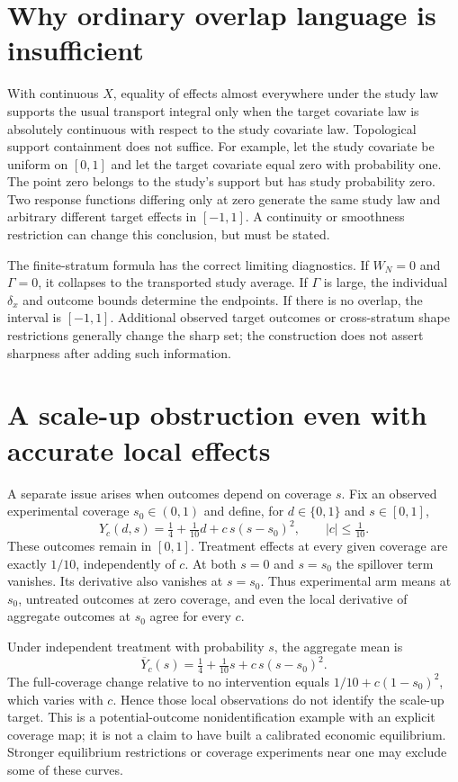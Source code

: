 \documentclass[11pt]{article}
\begin{document}
\section*{Why ordinary overlap language is insufficient}
With continuous $X$, equality of effects almost everywhere under the study law supports the usual transport integral only when the target covariate law is absolutely continuous with respect to the study covariate law. Topological support containment does not suffice. For example, let the study covariate be uniform on $[0,1]$ and let the target covariate equal zero with probability one. The point zero belongs to the study's support but has study probability zero. Two response functions differing only at zero generate the same study law and arbitrary different target effects in $[-1,1]$. A continuity or smoothness restriction can change this conclusion, but must be stated.

The finite-stratum formula has the correct limiting diagnostics. If $W_N=0$ and $\Gamma=0$, it collapses to the transported study average. If $\Gamma$ is large, the individual $\delta_x$ and outcome bounds determine the endpoints. If there is no overlap, the interval is $[-1,1]$. Additional observed target outcomes or cross-stratum shape restrictions generally change the sharp set; the construction does not assert sharpness after adding such information.

\section*{A scale-up obstruction even with accurate local effects}
A separate issue arises when outcomes depend on coverage $s$. Fix an observed experimental coverage $s_0\in(0,1)$ and define, for $d\in\{0,1\}$ and $s\in[0,1]$,
\[
 Y_c(d,s)=\tfrac14+\tfrac1{10}d+c\,s(s-s_0)^2,
 \qquad |c|\leq\tfrac1{10}.
\]
These outcomes remain in $[0,1]$. Treatment effects at every given coverage are exactly $1/10$, independently of $c$. At both $s=0$ and $s=s_0$ the spillover term vanishes. Its derivative also vanishes at $s=s_0$. Thus experimental arm means at $s_0$, untreated outcomes at zero coverage, and even the local derivative of aggregate outcomes at $s_0$ agree for every $c$.

Under independent treatment with probability $s$, the aggregate mean is
\[
 \overline Y_c(s)=\tfrac14+\tfrac1{10}s+c\,s(s-s_0)^2.
\]
The full-coverage change relative to no intervention equals
$1/10+c(1-s_0)^2$, which varies with $c$. Hence those local observations do not identify the scale-up target. This is a potential-outcome nonidentification example with an explicit coverage map; it is not a claim to have built a calibrated economic equilibrium. Stronger equilibrium restrictions or coverage experiments near one may exclude some of these curves.
\end{document}
